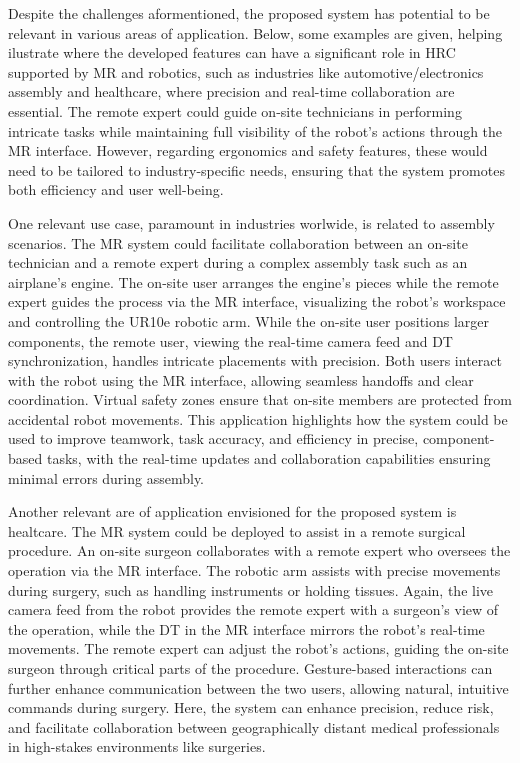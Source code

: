 Despite the challenges aformentioned, the proposed system has potential to be relevant in various areas of application. Below, some examples are given, helping ilustrate where the developed features can have a significant role in \ac{HRC} supported by \ac{MR} and robotics, such as industries like automotive/electronics assembly and healthcare, where precision and real-time collaboration are essential. The remote expert could guide on-site technicians in performing intricate tasks while maintaining full visibility of the robot’s actions through the \ac{MR} interface. However, regarding ergonomics and safety features, these would need to be tailored to industry-specific needs, ensuring that the system promotes both efficiency and user well-being.

One relevant use case, paramount in industries worlwide, is related to assembly scenarios. The \ac{MR} system could facilitate collaboration between an on-site technician and a remote expert during a complex assembly task such as an airplane's engine. The on-site user arranges the engine's pieces while the remote expert guides the process via the \ac{MR} interface, visualizing the robot’s workspace and controlling the UR10e robotic arm. While the on-site user positions larger components, the remote user, viewing the real-time camera feed and \ac{DT} synchronization, handles intricate placements with precision. Both users interact with the robot using the \ac{MR} interface, allowing seamless handoffs and clear coordination. Virtual safety zones ensure that on-site members are protected from accidental robot movements. This application highlights how the system could be used to improve teamwork, task accuracy, and efficiency in precise, component-based tasks, with the real-time updates and collaboration capabilities ensuring minimal errors during assembly.

Another relevant are of application envisioned for the proposed system is healtcare. The \ac{MR} system could be deployed to assist in a remote surgical procedure. An on-site surgeon collaborates with a remote expert who oversees the operation via the \ac{MR} interface. The robotic arm assists with precise movements during surgery, such as handling instruments or holding tissues. Again, the live camera feed from the robot provides the remote expert with a surgeon’s view of the operation, while the \ac{DT} in the \ac{MR} interface mirrors the robot's real-time movements. The remote expert can adjust the robot’s actions, guiding the on-site surgeon through critical parts of the procedure. Gesture-based interactions can further enhance communication between the two users, allowing natural, intuitive commands during surgery. Here, the system can enhance precision, reduce risk, and facilitate collaboration between geographically distant medical professionals in high-stakes environments like surgeries.









